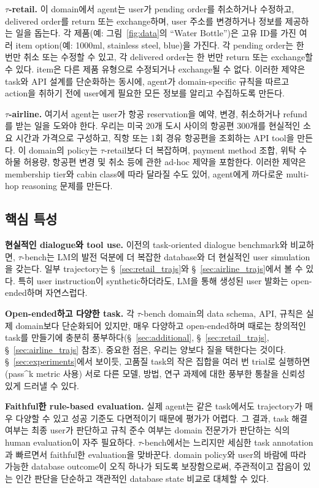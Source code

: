 \documentclass{article}
\newcommand{\benchmark}{$\tau$-bench}
\newcommand{\retail}{$\tau$-retail}  %
\newcommand{\airline}{$\tau$-airline}
\begin{document}
\textbf{\retail{}.} 이 domain에서 agent는 user가 pending order를 취소하거나 수정하고, delivered order를 return 또는 exchange하며, user 주소를 변경하거나 정보를 제공하는 일을 돕는다. 각 제품(예: 그림~\ref{fig:data}의 ``Water Bottle'')은 고유 ID를 가진 여러 item option(예: 1000ml, stainless steel, blue)을 가진다. 각 pending order는 한 번만 취소 또는 수정할 수 있고, 각 delivered order는 한 번만 return 또는 exchange할 수 있다. item은 다른 제품 유형으로 수정되거나 exchange될 수 없다. 이러한 제약은 task와 API 설계를 단순화하는 동시에, agent가 domain-specific 규칙을 따르고 action을 취하기 전에 user에게 필요한 모든 정보를 알리고 수집하도록 만든다.


\textbf{\airline{}.} 여기서 agent는 user가 항공 reservation을 예약, 변경, 취소하거나 refund를 받는 일을 도와야 한다. 우리는 미국 20개 도시 사이의 항공편 300개를 현실적인 소요 시간과 가격으로 구성하고, 직항 또는 1회 경유 항공편을 조회하는 API tool을 만든다. 이 domain의 policy는 \retail{}보다 더 복잡하며, payment method 조합, 위탁 수하물 허용량, 항공편 변경 및 취소 등에 관한 ad-hoc 제약을 포함한다. 이러한 제약은 membership tier와 cabin class에 따라 달라질 수도 있어, agent에게 까다로운 multi-hop reasoning 문제를 만든다.



\subsection{핵심 특성}


\textbf{현실적인 dialogue와 tool use.} 이전의 task-oriented dialogue benchmark와 비교하면, \benchmark{}는 LM의 발전 덕분에 더 복잡한 database와 더 현실적인 user simulation을 갖는다. 일부 trajectory는 \S~\ref{sec:retail_trajs}와 \S~\ref{sec:airline_trajs}에서 볼 수 있다. 특히 user instruction이 synthetic하더라도, LM을 통해 생성된 user 발화는 open-ended하며 자연스럽다.

\textbf{Open-ended하고 다양한 task.} 각 \benchmark{} domain의 data schema, API, 규칙은 실제 domain보다 단순화되어 있지만, 매우 다양하고 open-ended하며 때로는 창의적인 task를 만들기에 충분히 풍부하다(\S~\ref{sec:additional}, \S~\ref{sec:retail_trajs}, \S~\ref{sec:airline_trajs} 참조).
중요한 점은, 우리는 양보다 질을 택한다는 것이다. \S~\ref{sec:experiments}에서 보이듯, 고품질 task의 작은 집합을 여러 번 trial로 실행하면(pass\textasciicircum k metric 사용) 서로 다른 모델, 방법, 연구 과제에 대한 풍부한 통찰을 신뢰성 있게 드러낼 수 있다.

\textbf{Faithful한 rule-based evaluation.} 실제 agent는 같은 task에서도 trajectory가 매우 다양할 수 있고 성공 기준도 다면적이기 때문에 평가가 어렵다. 그 결과, task 해결 여부는 최종 user가 판단하고 규칙 준수 여부는 domain 전문가가 판단하는 식의 human evaluation이 자주 필요하다. \benchmark{}에서는 느리지만 세심한 task annotation과 빠르면서 faithful한 evaluation을 맞바꾼다. domain policy와 user의 바람에 따라 가능한 database outcome이 오직 하나가 되도록 보장함으로써, 주관적이고 잡음이 있는 인간 판단을 단순하고 객관적인 database state 비교로 대체할 수 있다.
\end{document}
